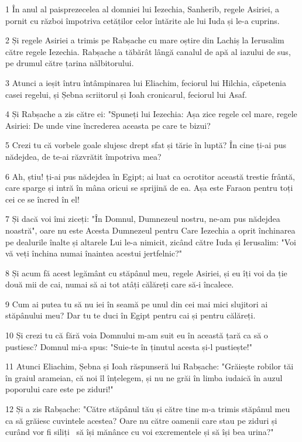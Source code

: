 \par 1 În anul al paisprezecelea al domniei lui Iezechia, Sanherib, regele Asiriei, a pornit cu război împotriva cetăților celor întărite ale lui Iuda și le-a cuprins.
\par 2 Și regele Asiriei a trimis pe Rabșache cu mare oștire din Lachiș la Ierusalim către regele Iezechia. Rabșache a tăbărât lângă canalul de apă al iazului de sus, pe drumul către țarina nălbitorului.
\par 3 Atunci a ieșit întru întâmpinarea lui Eliachim, feciorul lui Hilchia, căpetenia casei regelui, și Șebna scriitorul și Ioah cronicarul, feciorul lui Asaf.
\par 4 Și Rabșache a zis către ei: "Spuneți lui Iezechia: Așa zice regele cel mare, regele Asiriei: De unde vine încrederea aceasta pe care te bizui?
\par 5 Crezi tu că vorbele goale slujesc drept sfat și tărie în luptă? În cine ți-ai pus nădejdea, de te-ai răzvrătit împotriva mea?
\par 6 Ah, știu! ți-ai pus nădejdea în Egipt; ai luat ca ocrotitor această trestie frântă, care sparge și intră în mâna oricui se sprijină de ea. Așa este Faraon pentru toți cei ce se încred în el!
\par 7 Și dacă voi îmi ziceți: "În Domnul, Dumnezeul nostru, ne-am pus nădejdea noastră", oare nu este Acesta Dumnezeul pentru Care Iezechia a oprit închinarea pe dealurile înalte și altarele Lui le-a nimicit, zicând către Iuda și Ierusalim: "Voi vă veți închina numai înaintea acestui jertfelnic?"
\par 8 Și acum fă acest legământ cu stăpânul meu, regele Asiriei, și eu îți voi da ție două mii de cai, numai să ai tot atâți călăreți care să-i încalece.
\par 9 Cum ai putea tu să nu iei în seamă pe unul din cei mai mici slujitori ai stăpânului meu? Dar tu te duci în Egipt pentru cai și pentru călăreți.
\par 10 Și crezi tu că fără voia Domnului m-am suit eu în această țară ca să o pustiesc? Domnul mi-a spus: "Suie-te în ținutul acesta și-l pustiește!"
\par 11 Atunci Eliachim, Șebna și Ioah răspunseră lui Rabșache: "Grăiește robilor tăi în graiul arameian, că noi îl înțelegem, și nu ne grăi în limba iudaică în auzul poporului care este pe ziduri!"
\par 12 Și a zis Rabșache: "Către stăpânul tău și către tine m-a trimis stăpânul meu ca să grăiesc cuvintele acestea? Oare nu către oamenii care stau pe ziduri și curând vor fi siliți  să își mănânce cu voi excrementele și să își bea urina?"
